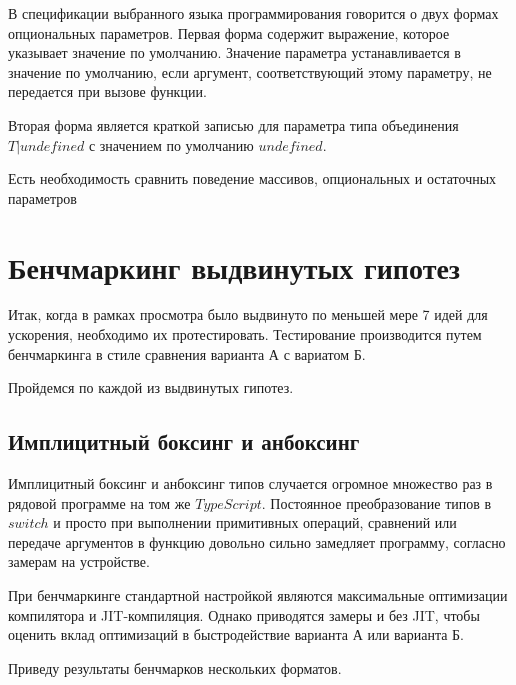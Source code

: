 \documentclass{mipt-thesis-bs}
\begin{document}
В спецификации выбранного языка программирования говорится о двух формах
опциональных параметров. Первая форма содержит выражение, которое
указывает значение по умолчанию. Значение параметра устанавливается
в значение по умолчанию, если аргумент, соответствующий
этому параметру, не передается при вызове функции.

Вторая форма является краткой записью для параметра типа объединения
$T | undefined$ с значением по умолчанию $undefined$.

Есть необходимость сравнить поведение массивов, опциональных и остаточных параметров

\section{Бенчмаркинг выдвинутых гипотез}

Итак, когда в рамках просмотра было выдвинуто по меньшей мере 7 идей для ускорения,
необходимо их протестировать. Тестирование производится путем бенчмаркинга в стиле
сравнения варианта А с вариатом Б.

Пройдемся по каждой из выдвинутых гипотез.
\subsection{Имплицитный боксинг и анбоксинг}
Имплицитный боксинг и анбоксинг типов случается огромное множество раз в рядовой программе
на том же $TypeScript$. Постоянное преобразование типов в $switch$ и просто при выполнении
примитивных операций, сравнений или передаче аргументов в функцию довольно сильно замедляет
программу, согласно замерам на устройстве.

При бенчмаркинге стандартной
настройкой являются максимальные оптимизации компилятора и JIT-компиляция.
Однако приводятся замеры и без JIT, чтобы оценить вклад оптимизаций
в быстродействие варианта А или варианта Б.

Приведу результаты бенчмарков нескольких форматов.
\end{document}
